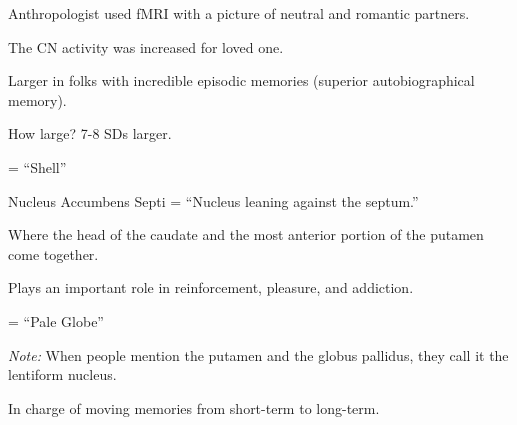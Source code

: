 \begin{coloredlist}
\begin{coloredlist}
\begin{coloredlist}
\begin{coloredlist}
                \begin{coloredlist}
                    \item Anthropologist used fMRI with a picture of neutral and romantic partners.
                    \item The CN activity was increased for loved one.
                \end{coloredlist}
            \end{coloredlist}
            \item Larger in folks with incredible episodic memories (superior autobiographical memory).
            \begin{coloredlist}
                \item How large? 7-8 SDs larger.
            \end{coloredlist}
        \end{coloredlist}
        \item {} = ``Shell''
        \item {}
        \begin{coloredlist}
            \item Nucleus Accumbens Septi = ``Nucleus leaning against the septum.''
            \begin{coloredlist}
                \item Where the head of the caudate and the most anterior portion of the putamen come together.
                \item Plays an important role in reinforcement, pleasure, and addiction.
            \end{coloredlist}
        \end{coloredlist}
    \end{coloredlist}
    \item {} = ``Pale Globe''
    \item \textit{Note:} When people mention the putamen and the globus pallidus, they call it the lentiform nucleus.
    \begin{coloredlist}
        \item {}
        \begin{coloredlist}
            \item {}
            \begin{coloredlist}
                \item In charge of moving memories from short-term to long-term.
            \end{coloredlist}

\end{coloredlist}
\end{coloredlist}
\end{coloredlist}
